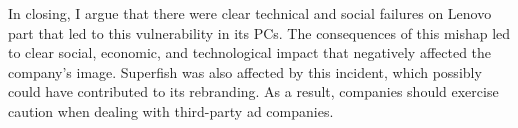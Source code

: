 \documentclass[journal]{IEEEtran}
\begin{document}
In closing, I argue that there were clear technical and social failures on Lenovo part that led to this vulnerability in its PCs. The consequences of this mishap led to clear social, economic, and technological impact that negatively affected the company's image. Superfish was also affected by this incident, which possibly could have contributed to its rebranding. As a result, companies should exercise caution when dealing with third-party ad companies. 

\newpage





%



\ifCLASSOPTIONcaptionsoff
  \newpage
\fi




\end{document}
